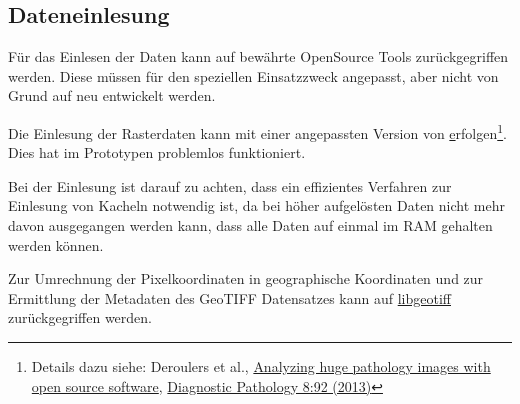 \documentclass[
11pt, %
a4paper, %
oneside, %
pdfspacing, %
headinclude,
BCOR5mm, %
ngerman, %
bibtotocnumbered,
]{scrartcl}
\begin{document}
	\subsection{Dateneinlesung}
	Für das Einlesen der Daten kann auf bewährte OpenSource Tools zurückgegriffen werden. Diese müssen für den speziellen Einsatzzweck angepasst, aber nicht von Grund auf neu entwickelt werden.
	
	Die Einlesung der Rasterdaten kann mit einer angepassten Version von \href{https://www.imnc.in2p3.fr/pagesperso/deroulers/software/largetifftools/tifffastcrop.html} erfolgen\footnote{
	Details dazu siehe: Deroulers et al., \href{https://www.imnc.in2p3.fr/pagesperso/deroulers/software/ndpitools/article_diagnostic_pathology.pdf}{Analyzing huge pathology images with open source software}, \href{http://www.diagnosticpathology.org/content/8/1/92}{Diagnostic Pathology 8:92 (2013)}}. 
	Dies hat im Prototypen problemlos funktioniert.
	
	Bei der Einlesung ist darauf zu achten, dass ein effizientes Verfahren zur Einlesung von Kacheln notwendig ist, da bei höher aufgelösten Daten nicht mehr davon ausgegangen werden kann, dass alle Daten auf einmal im RAM gehalten werden können.
	
	Zur Umrechnung der Pixelkoordinaten in geographische Koordinaten und zur Ermittlung der Metadaten des GeoTIFF Datensatzes kann auf \href{https://trac.osgeo.org/geotiff/}{libgeotiff} zurückgegriffen werden.
	
	\skippingparagraph
	\skippingparagraph	%
	
	
\end{document}
